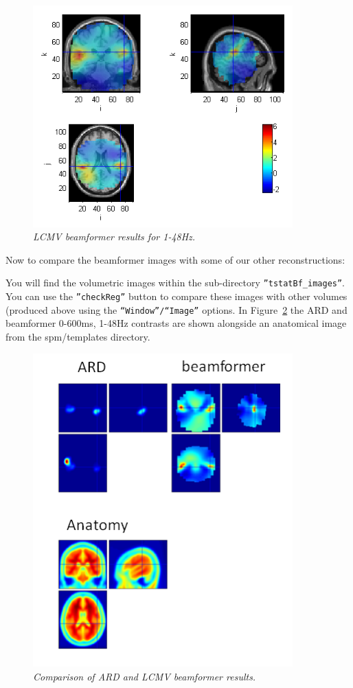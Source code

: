 \begin{figure}
\begin{center}
\includegraphics[width=100mm]{meg_sloc/slide11}
\caption{\em LCMV beamformer results for 1-48Hz.\label{meg_sloc:fig:11}}
\end{center}
\end{figure}

Now to compare the beamformer images with some of our other reconstructions:

You will find the volumetric images within the sub-directory \texttt{''tstatBf\_images''}. You can use the \texttt{''checkReg''} button to compare these images with other volumes (produced above using the \texttt{``Window''/``Image''} options. In Figure~\ref{meg_sloc:fig:12} the ARD and beamformer 0-600ms, 1-48Hz contrasts are shown alongside an anatomical image from the spm/templates directory.

\begin{figure}
\begin{center}
\includegraphics[width=100mm]{meg_sloc/slide12}
\caption{\em Comparison of ARD and LCMV beamformer results.\label{meg_sloc:fig:12}}
\end{center}
\end{figure}

